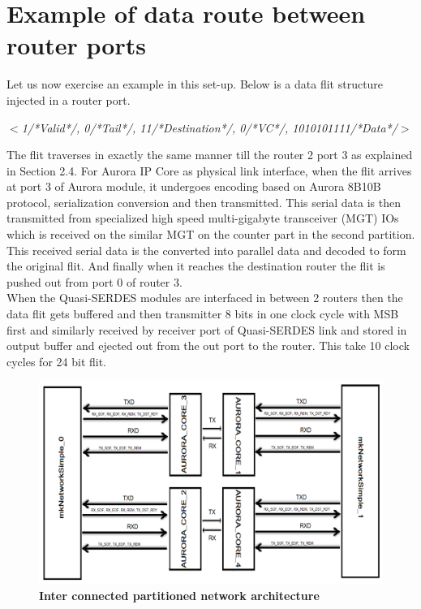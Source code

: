 \section {Example of data route between router ports}

Let us now exercise an example in this set-up. Below is a data flit structure injected in a router port.\\
\begin{centering}\textit{$<$1/*Valid*/, 0/*Tail*/, 11/*Destination*/, 0/*VC*/, 1010101111/*Data*/$>$}\end{centering}

The flit traverses in exactly the same manner till the router 2 port 3 as explained in Section 2.4. For Aurora IP Core as physical link interface, when the flit arrives at port 3 of Aurora module, it undergoes encoding based on Aurora 8B10B protocol, serialization conversion and then transmitted. This serial data is then transmitted from specialized high speed multi-gigabyte transceiver (MGT) IOs which is received on the similar MGT on the counter part in the second partition. This received serial data is the converted into parallel data and decoded to form the original flit. And finally when it reaches the destination router the flit is pushed out from port 0 of router 3.\\ 

When the Quasi-SERDES modules are interfaced in between 2 routers then the data flit gets buffered and then transmitter 8 bits in one clock cycle with MSB first and similarly received by receiver port of Quasi-SERDES link and stored in output buffer and ejected out from the out port to the router. This take 10 clock cycles for 24 bit flit. \\


\begin{centering}
\begin{figure}[H]
  \centering
   \includegraphics[scale=1]{./figs/PartitioningArchitecture}
  \caption{\textbf{Inter connected partitioned network architecture}}
  \label{PartitioningArchitecture}
\end{figure}
\end{centering}

